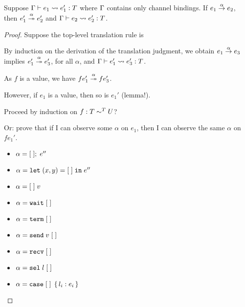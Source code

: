 \begin{lemma}
  Suppose $\Ctxt \vdash e_1 \leadsto e'_1 : T$ where $\Ctxt$ contains
  only channel bindings.  If
  $\reduce[\alpha]{e_1}{e_2}$, then $\reducemany[\alpha]{e'_1}{e'_2}$
  and $\Ctxt \vdash e_2 \leadsto e'_2 : T$.
\end{lemma}
\begin{proof}
  Suppose the top-level translation rule is
  \begin{mathpar}
  \end{mathpar}
  By induction on the derivation of the translation judgment, we
  obtain
  $\reduce[\alpha]{e_1}{e_3}$ implies $\reducemany[\alpha]{e_1'}{e'_3}$,
  for all $\alpha$, and $\Ctxt \vdash e_1' \leadsto e'_3 : T$.

  As $f$ is a value, we have $\reducemany[\alpha]{f e_1'}{f e'_3}$.



  However, if $e_1$ is a value, then so is $e_1'$ (lemma!). 

  Proceed by induction on $f : T \eqt U$?

  Or: prove that if I can observe some $\alpha$ on $e_1$, then I can
  observe the same $\alpha$ on $f e_1'$.

  \begin{itemize}
  \item $\alpha = \ELetU\EHole{e''}$
  \item $\alpha = \ELetP xy\EHole{e''}$
  \item $\alpha = \EHole\; v$
  \item $\alpha = \EWait\EHole$
  \item $\alpha = \ETerm\EHole$
  \item $\alpha = \ESend{v}\EHole$
  \item $\alpha = \ERecv\EHole$
  \item $\alpha = \ESelect l \EHole$
  \item $\alpha = \ECase\EHole{l_i: e_i}$
  \end{itemize}
  
\end{proof}

